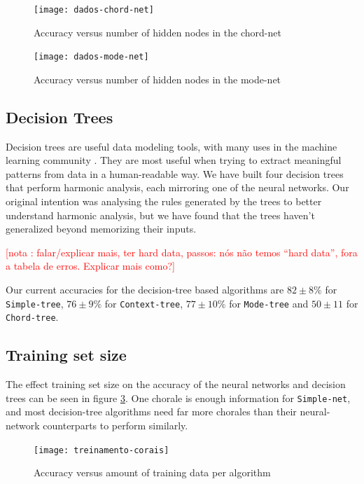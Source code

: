 \documentclass{article}
\newcounter{notacounter}
\newcommand{\nota}[1]{
  \addtocounter{notacounter}{1}
  \textcolor{red}{[nota \arabic{notacounter}: #1]}
}
\begin{document}
\begin{figure}
  \texttt{[image: dados-chord-net]}
  \caption{Accuracy versus number of hidden nodes in the chord-net}
  \label{fig:chord-net}
\end{figure}

\begin{figure}
  \texttt{[image: dados-mode-net]}
  \caption{Accuracy versus number of hidden nodes in the mode-net}
  \label{fig:mode-net}
\end{figure}

\subsection{Decision Trees}

Decision trees are useful data modeling tools, with many uses in the
machine learning community \cite{Mitchell:1997:ML,
  russell02:aima}. They are most useful when trying to extract
meaningful patterns from data in a human-readable way. We have built
four decision trees that perform harmonic analysis, each mirroring one
of the neural networks. Our original intention was analysing the rules
generated by the trees to better understand harmonic analysis, but we
have found that the trees haven't generalized beyond memorizing their
inputs. \nota{falar/explicar mais, ter hard data, passos: nós não
  temos ``hard data'', fora a tabela de erros. Explicar mais como?}

Our current accuracies for the decision-tree based algorithms are $82
\pm 8\%$ for \texttt{Simple-tree}, $76 \pm 9\%$ for
\texttt{Context-tree}, $77 \pm 10\%$ for \texttt{Mode-tree} and $50
\pm 11$ for \texttt{Chord-tree}.

\subsection{Training set size}

The effect training set size on the accuracy of the neural networks
and decision trees can be seen in figure
\ref{fig:treinamento-corais}. One chorale is enough information for
\texttt{Simple-net}, and most decision-tree algorithms need far more
chorales than their neural-network counterparts to perform similarly.

\begin{figure}
  \texttt{[image: treinamento-corais]}
  \caption{Accuracy versus amount of training data per algorithm}
  \label{fig:treinamento-corais}
\end{figure}
\end{document}
